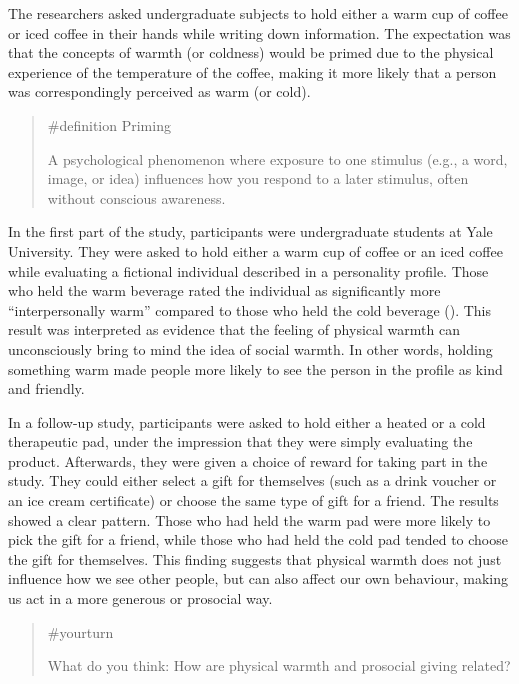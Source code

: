\documentclass[
  letterpaper,
]{book}
\begin{document}
The researchers asked undergraduate subjects to hold either a warm cup
of coffee or iced coffee in their hands while writing down information.
The expectation was that the concepts of warmth (or coldness) would be
primed due to the physical experience of the temperature of the coffee,
making it more likely that a person was correspondingly perceived as
warm (or cold).

\begin{quote}
\label{def-priming}{\#definition} Priming

A psychological phenomenon where exposure to one stimulus (e.g., a word,
image, or idea) influences how you respond to a later stimulus, often
without conscious awareness.
\end{quote}

In the first part of the study, participants were undergraduate students
at Yale University. They were asked to hold either a warm cup of coffee
or an iced coffee while evaluating a fictional individual described in a
personality profile. Those who held the warm beverage rated the
individual as significantly more ``interpersonally warm'' compared to
those who held the cold beverage
(). This result was interpreted as evidence that the feeling of
physical warmth can unconsciously bring to mind the idea of social
warmth. In other words, holding something warm made people more likely
to see the person in the profile as kind and friendly.

In a follow-up study, participants were asked to hold either a heated or
a cold therapeutic pad, under the impression that they were simply
evaluating the product. Afterwards, they were given a choice of reward
for taking part in the study. They could either select a gift for
themselves (such as a drink voucher or an ice cream certificate) or
choose the same type of gift for a friend. The results showed a clear
pattern. Those who had held the warm pad were more likely to pick the
gift for a friend, while those who had held the cold pad tended to
choose the gift for themselves. This finding suggests that physical
warmth does not just influence how we see other people, but can also
affect our own behaviour, making us act in a more generous or prosocial
way.

\begin{quote}
{\#yourturn}

What do you think: How are physical warmth and prosocial giving related?
\end{quote}
\end{document}
